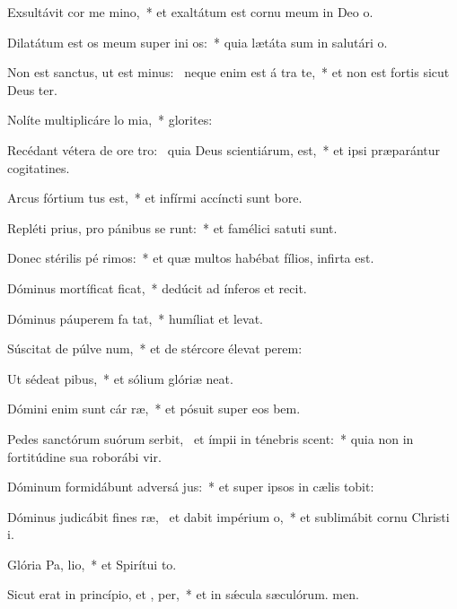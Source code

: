 \item Exsultávit cor me  mino,~* et exaltátum est cornu meum in Deo o.
\item Dilatátum est os meum super ini os:~* quia lætáta sum in salutári o.
\item Non est sanctus, ut est minus:~\pscross{} neque enim est á tra te,~* et non est fortis sicut Deus ter.
\item Nolíte multiplicáre lo mia,~* glorites:
\item Recédant vétera de ore tro:~\pscross{} quia Deus scientiárum,  est,~* et ipsi præparántur cogitatines.
\item Arcus fórtium tus est,~* et infírmi accíncti sunt bore.
\item Repléti prius, pro pánibus se runt:~* et famélici satuti sunt.
\item Donec stérilis pé rimos:~* et quæ multos habébat fílios, infirta est.
\item Dóminus mortíficat  ficat,~* dedúcit ad ínferos et recit.
\item Dóminus páuperem fa  tat,~* humíliat et levat.
\item Súscitat de púlve num,~* et de stércore élevat perem:
\item Ut sédeat  pibus,~* et sólium glóriæ neat.
\item Dómini enim sunt cár ræ,~* et pósuit super eos bem.
\item Pedes sanctórum suórum serbit,~\pscross{} et ímpii in ténebris scent:~* quia non in fortitúdine sua roborábi vir.
\item Dóminum formidábunt adversá jus:~* et super ipsos in cælis tobit:
\item Dóminus judicábit fines ræ,~\pscross{} et dabit impérium  o,~* et sublimábit cornu Christi i.
\item Glória Pa,  lio,~* et Spirítui to.
\item Sicut erat in princípio, et ,  per,~* et in sǽcula sæculórum. men.

